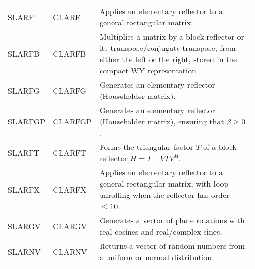 \begin{center}
\begin{tabular}{| l p{0.75in} |p{4.5in}    |}
SLARF&CLARF&
Applies an elementary reflector to a general rectangular matrix.\\
SLARFB&CLARFB& 
Multiplies a matrix by a block reflector or its transpose/conjugate-transpose, from either
the left or the right, stored in the compact WY representation.\\
SLARFG&CLARFG& 
Generates an elementary reflector (Householder matrix).\\
SLARFGP&CLARFGP&
Generates an elementary reflector (Householder matrix),
ensuring that $\beta \geq 0$.\\
SLARFT&CLARFT&
Forms the triangular factor $T$ of a block reflector $H = I - V T V^H$.\\
SLARFX&CLARFX& 
Applies an elementary reflector to a general rectangular matrix,
with loop unrolling when the reflector has order $\leq 10$.\\
SLARGV&CLARGV& 
Generates a vector of plane rotations with real cosines and real/complex 
sines.\\
SLARNV&CLARNV& 
Returns a vector of random numbers from a uniform or normal distribution.\\
\hline
\end{tabular}
\end{center}

